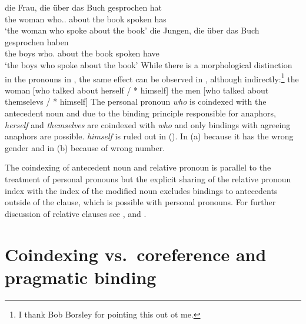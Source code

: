\documentclass[output=paper
	        ,collection
	        ,collectionchapter
 	        ,biblatex
                ,babelshorthands
                ,newtxmath
                ,draftmode
                ,colorlinks, citecolor=brown
]{langscibook}
\begin{document}
{\ex
\gll die Frau, die über das Buch gesprochen hat\\
     the woman who.\F.\SG{} about the book spoken has\\
\glt `the woman who spoke about the book'
\ex
\gll die Jungen, die über das Buch gesprochen haben\\
     the boys    who.\PL{} about the book spoken have\\
\glt `the boys who spoke about the book'
\zl
While there is a morphological distinction in the pronouns in , the same effect can be
observed in , although indirectly:\footnote{%
  I thank Bob Borsley for pointing this out ot me.
}
\eal
\ex the woman [who talked about herself / * himself]
\ex the men [who talked about themselevs / * himself]
\zl
The personal pronoun \emph{who} is coindexed with the antecedent noun and due to the binding
principle responsible for anaphors, \emph{herself} and \emph{themselves} are coindexed with
\emph{who} and only bindings with agreeing anaphors are possible. \emph{himself} is ruled out in
(). In (a) because it has the wrong gender and in (b) because of wrong number.

The coindexing of antecedent noun and relative pronoun is parallel to the
treatment of personal pronouns but the explicit sharing of the relative pronoun index with the index
of the modified noun excludes bindings to antecedents outside of the clause, which is possible with
personal pronouns.
For further discussion of relative clauses see ,
 and .
}

\section{Coindexing vs.\ coreference and pragmatic binding}

\end{document}
